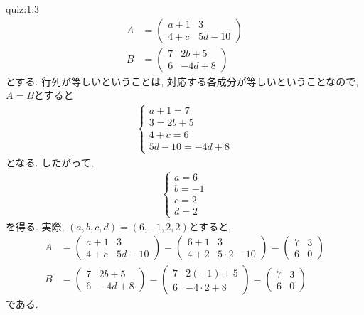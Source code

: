 \begin{answerof}{quiz:1:3}
  \begin{align*}A&=
    \begin{pmatrix}
      a+1& 3\\
      4+c &5d-10
    \end{pmatrix}\\
    B&=
    \begin{pmatrix}
      7& 2b+5\\
      6 &-4d+8
    \end{pmatrix}
  \end{align*}
  とする.
  行列が等しいということは, 対応する各成分が等しいということなので,
  $A=B$とすると
  \begin{align*}
    \begin{cases}
      a+1=7\\
      3=2b+5\\
      4+c=6\\
      5d-10=-4d+8
    \end{cases}
  \end{align*}
  となる.
  したがって,
  \begin{align*}
    \begin{cases}
      a=6\\
      b=-1\\
      c=2\\
      d=2
    \end{cases}
  \end{align*}
  を得る.
  実際, $(a,b,c,d)=(6,-1,2,2)$とすると,
  \begin{align*}A&=
    \begin{pmatrix}
      a+1& 3\\
      4+c &5d-10
    \end{pmatrix}
    =
    \begin{pmatrix}
      6+1& 3\\
      4+2 &5\cdot 2-10
    \end{pmatrix}
    =
    \begin{pmatrix}
      7& 3\\
      6&0
    \end{pmatrix}
    \\
    B&=
    \begin{pmatrix}
      7& 2b+5\\
      6 &-4d+8
    \end{pmatrix}
=    \begin{pmatrix}
      7& 2(-1)+5\\
      6 &-4\cdot 2+8
    \end{pmatrix}
=    \begin{pmatrix}
      7& 3\\
      6 &0
    \end{pmatrix}
  \end{align*}
  である.
\end{answerof}

